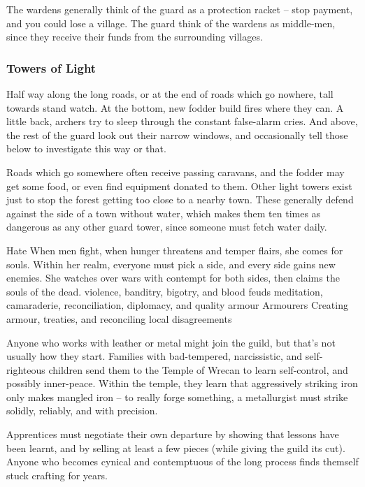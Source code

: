 \begin{multicols}{2}
The wardens generally think of the \gls{guard} as a protection racket -- stop payment, and you could lose a village.
The \gls{guard} think of the wardens as middle-men, since they receive their funds from the surrounding villages.

\subsubsection{Towers of Light}
Half way along the long roads, or at the end of roads which go nowhere, tall towards stand watch.
At the bottom, new fodder build fires where they can.
A little back, archers try to sleep through the constant false-alarm cries.
And above, the rest of the guard look out their narrow windows, and occasionally tell those below to investigate this way or that.

Roads which go somewhere often receive passing caravans, and the fodder may get some food, or even find equipment donated to them.
Other light towers exist just to stop the forest getting too close to a nearby town.
These generally defend against the side of a town without water, which makes them ten times as dangerous as any other \gls{guard} tower, since someone must fetch water daily.


  {\textxswup}%
  {Hate}%
  {When men fight, when hunger threatens and temper flairs, she comes for souls.
  Within her realm, everyone must pick a side, and every side gains new enemies.
  She watches over wars with contempt for both sides, then claims the souls of the dead.}%
  {violence, banditry, bigotry, and blood feuds}%
  {meditation, camaraderie, reconciliation, diplomacy, and quality armour}%
  {Armourers}%
  {Creating armour, treaties, and reconciling local disagreements}%

Anyone who works with leather or metal might join the guild, but that's not usually how they start.
Families with bad-tempered, narcissistic, and self-righteous children send them to the Temple of Wrecan to learn self-control, and possibly inner-peace.
Within the temple, they learn that aggressively striking iron only makes mangled iron -- to really forge something, a metallurgist must strike solidly, reliably, and with precision.

Apprentices must negotiate their own departure by showing that lessons have been learnt, and by selling at least a few pieces (while giving the guild its cut).
Anyone who becomes cynical and contemptuous of the long process finds themself stuck crafting for years.


\end{multicols}
